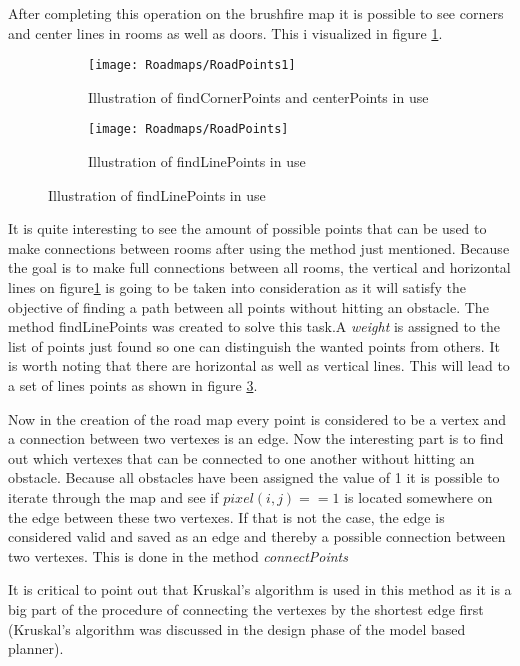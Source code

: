 \documentclass[../Head/Main.tex]{subfiles}
\begin{document}
After completing this operation on the brushfire map it is possible to see corners and center lines in rooms as well as doors. This i visualized in figure \ref{fig:CornersAndCentersOfRoom}.
  
  \begin{figure}[H]
   \begin{subfigure}[b]{0.49\textwidth}
    \centering
    \texttt{[image: Roadmaps/RoadPoints1]}
    \caption{Illustration of findCornerPoints and centerPoints in use}
    \label{fig:CornersAndCentersOfRoom}
  \end{subfigure}
  \hfill
   \begin{subfigure}[b]{0.49\textwidth}
    \centering
    \texttt{[image: Roadmaps/RoadPoints]}
    \caption{Illustration of findLinePoints in use}
    \label{fig:LinePoints}
  \end{subfigure}
  \end{figure}

It is quite interesting to see the amount of possible points that can be used to make connections between rooms after using the method just mentioned. Because the goal is to make full connections between all rooms, the vertical and horizontal lines on figure\ref{fig:CornersAndCentersOfRoom} is going to be taken into consideration as it will satisfy the objective of finding a path between all points without hitting an obstacle. The method findLinePoints was created to solve this task.A \textit{weight} is assigned to the list of points just found so one can distinguish the wanted points from others. It is worth noting that there are horizontal as well as vertical lines. This will lead to a set of lines points as shown in figure \ref{fig:LinePoints}. 

Now in the creation of the road map every point is considered to be a vertex and a connection between two vertexes is an edge. Now the interesting part is to find out which vertexes that can be connected to one another without hitting an obstacle. Because all obstacles have been assigned the value of 1 it is possible to iterate through the map and see if $pixel(i,j) == 1$ is located somewhere on the edge between these two vertexes. If that is not the case, the edge is considered valid and saved as an edge and thereby a possible connection between two vertexes. This is done in the method \textit{connectPoints} \par
 It is critical to point out that Kruskal's algorithm is used in this method as it is a big part of the procedure of connecting the vertexes by the shortest edge first (Kruskal's algorithm was discussed in the design phase of the model based planner). 
\end{document}
